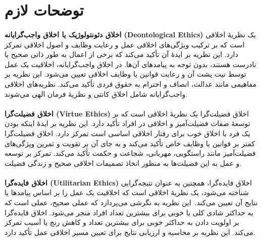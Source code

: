 
{
\section*{توضحات لازم}
\label{sec:توضحات لازم}
}
\paragraph{}
\textbf{اخلاق دئونتولوژیک یا اخلاق واجب‌گرایانه \textenglish{\textbf{(Deontological Ethics)}}}
یک نظریهٔ اخلاقی است که بر ترکیب ویژگی‌های اخلاقی عمل و رعایت وظایف و اصول اخلاقی تمرکز دارد.
این نظریه بر ایدهٔ آن تأکید می‌کند که برخی از اعمال به طور ذاتی صحیح یا نادرست هستند، بدون توجه به پیامدهای آن‌ها.
در اخلاق واجب‌گرایانه، اخلاقیت یک عمل توسط نیت پشت آن و رعایت قوانین یا وظایف اخلاقی تعیین می‌شود.
این نظریه بر مفاهیمی مانند عدالت، انصاف و احترام به حقوق فردی تأکید می‌کند.
نظریه‌های اخلاقی واجب‌گرایانه شامل اخلاق کانتی و نظریهٔ فرمان الهی می‌شوند.

\paragraph{}
\textbf{اخلاق فضیلت‌گرا \textenglish{\textbf{(Virtue Ethics)}}}
اخلاق فضیلت‌گرا یک نظریهٔ اخلاقی است که بر توسعهٔ صفات فضیلت‌آمیز و اخلاقی در افراد تأکید دارد.
این نظریه بر ایدهٔ اینکه بودن یک فرد با اخلاق خوب برای رفتار اخلاقی اساسی است تمرکز دارد.
اخلاق فضیلت‌گرا کمتر بر قوانین یا وظایف خاص تأکید می‌کند و به جای آن بر تقویت و تمرین ویژگی‌های فضیلت‌آمیز مانند راستگویی، مهربانی، شجاعت و حکمت تأکید می‌کند.
تمرکز بر توسعه و عمل به این فضیلت‌ها به منظور اتخاذ تصمیمات اخلاقی صحیح و زندگی فضیلت.

\paragraph{}
\textbf{اخلاق فایده‌گرا \textenglish{\textbf{(Utilitarian Ethics)}}}
اخلاق فایده‌گرا، همچنین به عنوان نتیجه‌گرایی شناخته می‌شود، یک نظریهٔ اخلاقی است که اخلاقیت یک عمل را بر اساس پیامدها یا نتایج آن تعیین می‌کند.\     این نظریه به نگرشی می‌پردازد که عملی صحیح، عملی است که به حداکثر شادی کلی یا خوبی برای بیشترین تعداد افراد منجر می‌شود.
اخلاق فایده‌گرا بر اولویت دادن به حداکثر خوبی برای بیشترین تعداد و کاهش رنج یا آسیب تمرکز می‌کند.
این نظریه بر محاسبه و ارزیابی نتایج برای تعیین مسیر اخلاقی عمل تأکید دارد.


\newpage


